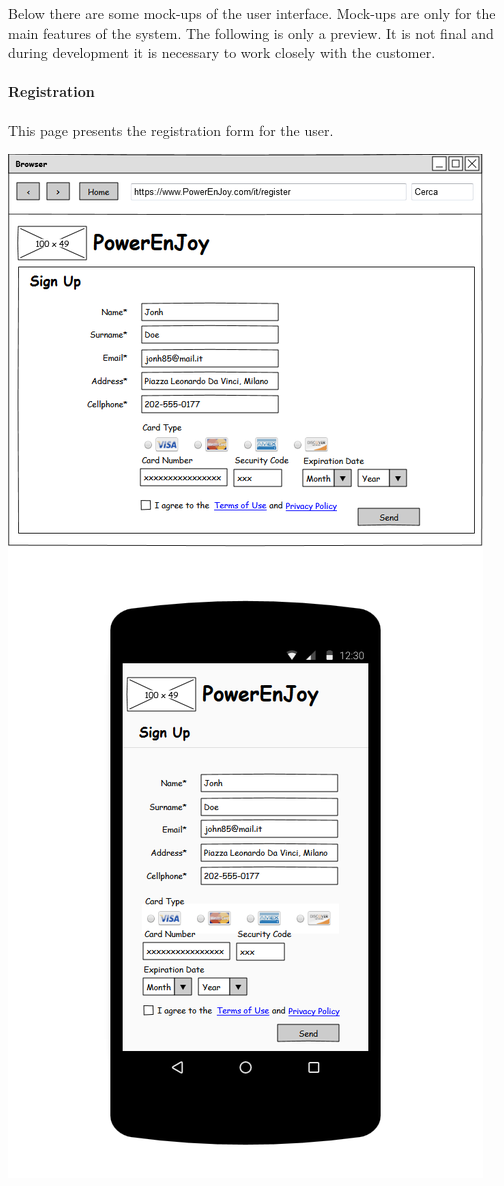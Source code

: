 Below there are some mock-ups of the user interface. Mock-ups are only for the main features of the system. The following is only a preview. It is not final and during development it is necessary to work closely with the customer.
			
\pagebreak
\paragraph{Registration} This page presents the registration form for the user.
\begin{center}
	\includegraphics[width=0.6\linewidth]{"img/ui/registration"}
\end{center}
\pagebreak


